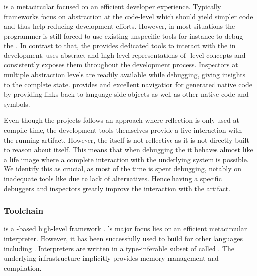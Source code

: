 \subsubsection*{\Maxine \Java \VM}
\Maxine is a metacircular \Java \VM \cite{Wimm13a} focused on an efficient developer experience.
Typically \VM frameworks focus on abstraction at the code-level which should yield simpler code and thus help reducing development efforts.
However, in most situations the programmer is still forced to use existing unspecific tools for instance to debug the \VM.
In contrast to that, the \Maxine \VM provides dedicated tools to interact with the \VM in development.
\Maxine uses abstract and high-level representations of \VM-level concepts and consistently exposes them throughout the development process.
Inspectors at multiple abstraction levels are readily available while debugging, giving insights to the complete \VM state.
\Maxine provides and excellent navigation for generated native code by providing links back to language-side objects as well as other native code and symbols.

Even though the \Maxine projects follows an approach where reflection is only used at compile-time, the development tools themselves provide a live interaction with the running \VM artifact.
However, the \VM itself is not reflective as it is not directly built to reason about itself.
This means that when debugging the \VM it behaves almost like a life \ST image where a complete interaction with the underlying system is possible.
We identify this as crucial, as most of the time is spent debugging, notably on inadequate tools like  due to lack of alternatives.
Hence having a specific debuggers and inspectors greatly improve the interaction with the \VM artifact.


\subsubsection*{\PyPy Toolchain}
 is a \Python-based high-level \VM framework \cite{Rigo06a}.
\PyPy's major focus lies on an efficient metacircular \Python interpreter.
However, it has been successfully used to build \VMs for other languages including \ST \cite{Bolz08a}.
Interpreters are written in a type-inferable subset of \Python called \RPython.
The underlying \PyPy infrastructure implicitly provides memory management and \JIT compilation.

